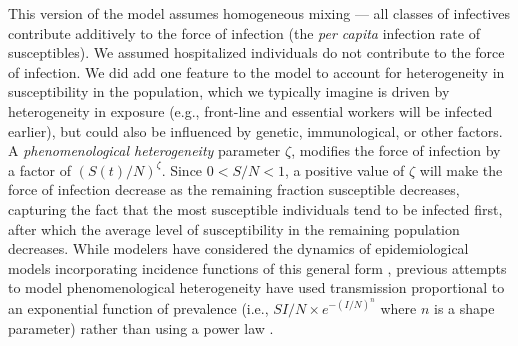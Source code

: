 \documentclass[12pt]{article}\usepackage[]{graphicx}\usepackage[]{color}
\begin{document}
This version of the model assumes homogeneous mixing --- all classes of infectives contribute additively to the force of infection (the \emph{per capita} infection rate of susceptibles).
We assumed hospitalized individuals do not contribute to the force of infection.   
We did add one feature to the model to account for heterogeneity in susceptibility in the population, which we typically imagine is driven by heterogeneity in exposure (e.g., front-line and essential workers will be infected earlier), but could also be influenced by genetic, immunological, or other factors.
A \emph{phenomenological heterogeneity} parameter  $\zeta$, modifies the force of infection by a factor of $\left(S(t)/N\right)^\zeta$. Since $0 < S/N < 1$, a positive value of $\zeta$ will make the force of infection decrease as the remaining fraction susceptible decreases, capturing the fact that the most susceptible individuals tend to be infected first, after which
the average level of susceptibility in the remaining population decreases. While modelers have considered the dynamics of epidemiological models incorporating incidence functions of this general form \cite{WilsWorc+45,Liu+87}, previous attempts to model phenomenological heterogeneity have used transmission proportional to an exponential function of prevalence (i.e., $S I/N \times e^{-(I/N)^n}$ where $n$ is a shape parameter) rather than using a power law \cite{Will+06,Gran+09}. 
\end{document}
